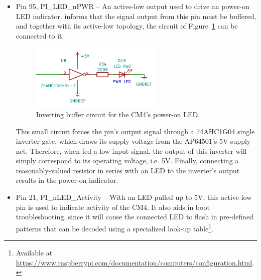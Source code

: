 \begin{itemize}
	\item Pin 95, PI\_LED\_nPWR -- An active-low output used to drive an power-on LED indicator.
	\cite{CM4} informs that the signal output from this pin must be buffered, and together with its active-low topology, the circuit of Figure~\ref{fig:PI_LED_nPWR} can be connected to it.
	\begin{figure}[H]
		\centering
		\includegraphics[width=0.6\textwidth]{Chapters/Figures/chapter3/PI_LED_nPWR.pdf}
		\caption{Inverting buffer circuit for the CM4's power-on LED.}
		\label{fig:PI_LED_nPWR}
	\end{figure}
	This small circuit forces the pin's output signal through a 74AHC1G04 single inverter gate, which draws its supply voltage from the AP64501's 5V supply net. Therefore, when fed a low input signal, the output of this inverter will simply correspond to its operating voltage, i.e. 5V. Finally, connecting a reasonably-valued resistor in series with an LED to the inverter's output results in the power-on indicator.

	\item Pin 21, PI\_nLED\_Activity -- With an LED pulled up to 5V, this active-low pin is used to indicate activity of the CM4. It also aids in boot troubleshooting, since it will cause the connected LED to flash in pre-defined patterns that can be decoded using a specialized look-up table\footnote[15]{Available at \url{https://www.raspberrypi.com/documentation/computers/configuration.html}.}.
\end{itemize}

